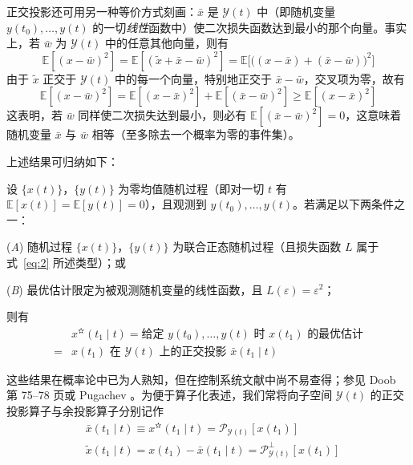正交投影还可用另一种等价方式刻画：$\bar{x}$ 是 $\mathcal{Y}(t)$ 中（即随机变量 $y(t_0), \dots, y(t)$ 的一切\emph{线性}函数中）使二次损失函数达到最小的那个向量。事实上，若 $\bar{w}$ 为 $\mathcal{Y}(t)$ 中的任意其他向量，则有
\begin{equation*}
\mathbb{E}[(x - \bar{w})^2] = \mathbb{E}[(\tilde{x} + \bar{x} - \bar{w})^2] = \mathbb{E}\bigl[\bigl((x - \bar{x}) + (\bar{x} - \bar{w})\bigr)^2\bigr]
\end{equation*}
由于 $\tilde{x}$ 正交于 $\mathcal{Y}(t)$ 中的每一个向量，特别地正交于 $\bar{x} - \bar{w}$，交叉项为零，故有
\begin{equation}\label{eq:10}
\mathbb{E}[(x - \bar{w})^2] = \mathbb{E}[(x - \bar{x})^2] + \mathbb{E}[(\bar{x} - \bar{w})^2] \geq \mathbb{E}[(x - \bar{x})^2]
\end{equation}
这表明，若 $\bar{w}$ 同样使二次损失达到最小，则必有 $\mathbb{E}[(\bar{x} - \bar{w})^2] = 0$，这意味着随机变量 $\bar{x}$ 与 $\bar{w}$ 相等（至多除去一个概率为零的事件集）。

上述结果可归纳如下：

\begin{theorem}\label{thm:2}

设 $\{x(t)\}$，$\{y(t)\}$ 为零均值随机过程（即对一切 $t$ 有 $\mathbb{E}[x(t)] = \mathbb{E}[y(t)] = 0$），且观测到 $y(t_0), \dots, y(t)$。若满足以下两条件之一：

(\emph{A}) 随机过程 $\{x(t)\}$，$\{y(t)\}$ 为联合正态随机过程（且损失函数 $L$ 属于式~\eqref{eq:2} 所述类型）；或

(\emph{B}) 最优估计限定为被观测随机变量的线性函数，且 $L(\varepsilon) = \varepsilon^2$；

则有
\begin{equation}\label{eq:11}
\begin{aligned}
&x^{\text{✫}}(t_1 \mid t) = \text{给定 } y(t_0), \dots, y(t) \text{ 时 } x(t_1) \text{ 的最优估计} \\
= &x(t_1) \text{ 在 } \mathcal{Y}(t) \text{ 上的正交投影 } \bar{x}(t_1 \mid t)
\end{aligned}
\end{equation}
\end{theorem}

这些结果在概率论中已为人熟知，但在控制系统文献中尚不易查得；参见 Doob \cite{r15} 第 75–78 页或 Pugachev \cite{r26}。为便于算子化表述，我们常将向子空间 $\mathcal{Y}(t)$ 的正交投影算子与余投影算子分别记作
\begin{equation*}
\begin{aligned}
&\bar{x}(t_1 \mid t) \equiv x^{\text{✫}}(t_1 \mid t) = \mathscr{P}_{\mathcal{Y}(t)}[x(t_1)] \\
&\tilde{x}(t_1 \mid t) = x(t_1) - \bar{x}(t_1 \mid t) = \mathscr{P}_{\mathcal{Y}(t)}^{\perp}[x(t_1)]
\end{aligned}
\end{equation*}

